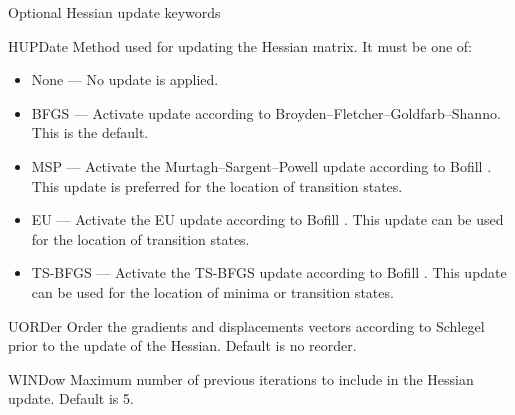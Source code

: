 Optional Hessian update keywords
\begin{keywordlist}
\item[HUPDate]
Method used for updating the Hessian matrix. It must be one of:
\begin{itemize}
\item None --- No update is applied.
\item BFGS --- Activate update according to Broyden--Fletcher--Goldfarb--Shanno.
This is the default.
\item MSP --- Activate the Murtagh--Sargent--Powell update according to Bofill \cite{MSP}.
This update is preferred for the location of transition states.
\item EU --- Activate the EU update according to Bofill \cite{EU}.
This update can be used for the location of transition states.
\item TS-BFGS --- Activate the TS-BFGS update according to Bofill \cite{EU}.
This update can be used for the location of minima or transition states.
\end{itemize}
\item[UORDer]
Order the gradients and displacements vectors according to Schlegel prior to
the update of the Hessian. Default is no reorder.
\item[WINDow]
Maximum number of previous iterations to include in the Hessian update.
Default is 5.
\end{keywordlist}

